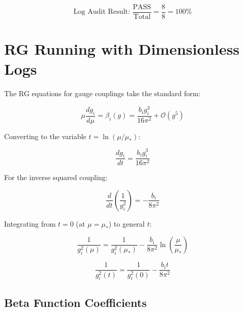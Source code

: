 \documentclass[11pt,a4paper]{article}
\theoremstyle{definition}
\begin{document}
\begin{equation}
\label{eq:log_audit_result}
\text{Log Audit Result: } \frac{\text{PASS}}{\text{Total}} = \frac{8}{8} = 100\%
\end{equation}

\section{RG Running with Dimensionless Logs}
\label{sec:rg_running}

The RG equations for gauge couplings take the standard form:

\begin{equation}
\label{eq:rg_beta}
\mu \frac{d g_i}{d\mu} = \beta_i(g) = \frac{b_i g_i^3}{16\pi^2} + \mathcal{O}(g^5)
\end{equation}

Converting to the variable $t = \ln(\mu/\mu_*)$:

\begin{equation}
\label{eq:rg_t}
\frac{d g_i}{dt} = \frac{b_i g_i^3}{16\pi^2}
\end{equation}

For the inverse squared coupling:

\begin{equation}
\label{eq:rg_inverse}
\frac{d}{dt}\left(\frac{1}{g_i^2}\right) = -\frac{b_i}{8\pi^2}
\end{equation}

Integrating from $t = 0$ (at $\mu = \mu_*$) to general $t$:

\begin{equation}
\label{eq:rg_solution}
\frac{1}{g_i^2(\mu)} = \frac{1}{g_i^2(\mu_*)} - \frac{b_i}{8\pi^2} \ln\left(\frac{\mu}{\mu_*}\right)
\end{equation}

\begin{equation}
\label{eq:rg_solution_t}
\frac{1}{g_i^2(t)} = \frac{1}{g_i^2(0)} - \frac{b_i t}{8\pi^2}
\end{equation}

\subsection{Beta Function Coefficients}
\label{subsec:beta_coeff}
\end{document}
